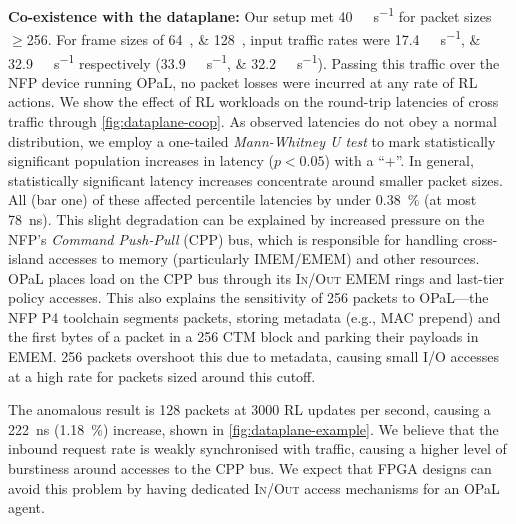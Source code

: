\documentclass[
sigconf,natbib=false
,anonymous=true
,10pt
]{acmart}
\newcommand{\fakepara}[1]{\noindent\textbf{#1:}}
\newcommand{\approachshort}{OPaL}
\newcommand{\inring}{\textsc{In}}
\newcommand{\outring}{\textsc{Out}}
\begin{document}
\fakepara{Co-existence with the dataplane}
Our setup met \SI{40}{\giga\bit\per\second} for packet sizes $\ge$\SI{256}{\byte}.
For frame sizes of \SIlist{64;128}{\byte}, input traffic rates were \SIlist{17.4;32.9}{\giga\bit\per\second} respectively (\SIlist[per-symbol=p,sticky-per=true]{33.9;32.2}{\mega\packet\per\second}).
Passing this traffic over the NFP device running \approachshort, no packet losses were incurred at any rate of RL actions.
We show the effect of RL workloads on the round-trip latencies of cross traffic through \cref{fig:dataplane-coop}.
As observed latencies do not obey a normal distribution, we employ a one-tailed \emph{Mann-Whitney U test} to mark statistically significant population increases in latency ($p < 0.05$) with a ``+''.
In general, statistically significant latency increases concentrate around smaller packet sizes.
All (bar one) of these affected  percentile latencies by under \SI{0.38}{\percent} (at most \SI{78}{\nano\second}).
This slight degradation can be explained by increased pressure on the NFP's \emph{Command Push-Pull} (CPP) bus, which is responsible for handling cross-island accesses to memory (particularly IMEM/EMEM) and other resources.
\approachshort{} places load on the CPP bus through its \inring{}/\outring{} EMEM rings and last-tier policy accesses.
This also explains the sensitivity of \SI{256}{\byte} packets to \approachshort{}---the NFP P4 toolchain segments packets, storing metadata (e.g., MAC prepend) and the first bytes of a packet in a \SI{256}{\byte} CTM block and parking their payloads in EMEM.
\SI{256}{\byte} packets overshoot this due to metadata, causing small I/O accesses at a high rate for packets sized around this cutoff.

The anomalous result is \SI{128}{\byte} packets at \num{3000} RL updates per second, causing a \SI{222}{\nano\second} (\SI{1.18}{\percent}) increase, shown in \cref{fig:dataplane-example}.
We believe that the inbound request rate is weakly synchronised with traffic, causing a higher level of burstiness around accesses to the CPP bus.
We expect that FPGA designs can avoid this problem by having dedicated \inring{}/\outring{} access mechanisms for an \approachshort{} agent.
\end{document}
